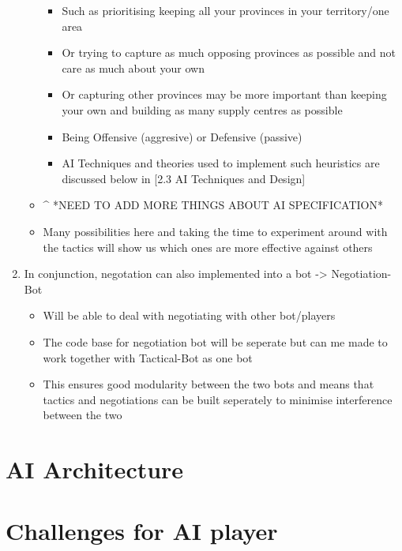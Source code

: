 \documentclass[12pt]{article}
\begin{document}
\begin{enumerate}
\begin{itemize}
\begin{itemize}
\item Such as prioritising keeping all your provinces in your territory/one
area
\item Or trying to capture as much opposing provinces as possible and not
care as much about your own
\item Or capturing other provinces may be more important than keeping your
own and building as many supply centres as possible
\item Being Offensive (aggresive) or Defensive (passive)
\item AI Techniques and theories used to implement such heuristics are discussed
below in {[}2.3 AI Techniques and Design{]}
\end{itemize}
\item \textasciicircum{} {*}NEED TO ADD MORE THINGS ABOUT AI SPECIFICATION{*}
\item Many possibilities here and taking the time to experiment around with
the tactics will show us which ones are more effective against others
\end{itemize}
\item In conjunction, negotation can also implemented into a bot -> Negotiation-Bot

\begin{itemize}
\item Will be able to deal with negotiating with other bot/players
\item The code base for negotiation bot will be seperate but can me made
to work together with Tactical-Bot as one bot
\item This ensures good modularity between the two bots and means that tactics
and negotiations can be built seperately to minimise interference
between the two
\end{itemize}
\end{enumerate}


\section{AI Architecture}

\section{Challenges for AI player}
\end{document}

